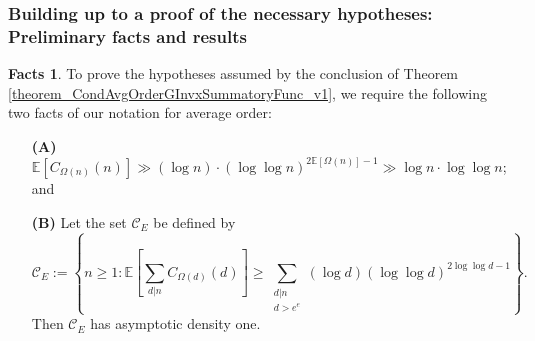 \documentclass[11pt,reqno,a4letter]{article}
\numberwithin{figure}{section}
\numberwithin{table}{section}
\theoremstyle{plain}
\numberwithin{theorem}{section}
\theoremstyle{definition}
\newtheorem{facts}[theorem]{Facts}
\begin{document}
\subsubsection{Building up to a proof of the necessary hypotheses: Preliminary facts and results} 
\label{subsubSection_ProvingTheNecessaryHyps_PrelimFactPfs} 

\begin{facts} 
To prove the hypotheses assumed by the conclusion of 
Theorem \ref{theorem_CondAvgOrderGInvxSummatoryFunc_v1}, 
we require the following two facts of our notation for average order: 
\begin{itemize} 
     \item[\textbf{(A)}] $\mathbb{E}[C_{\Omega(n)}(n)] \gg (\log n) \cdot (\log\log n)^{2\mathbb{E}[\Omega(n)]-1} \gg 
                          \log n \cdot \log\log n$; and 
     \item[\textbf{(B)}] Let the set $\mathcal{C}_E$ be defined by 
     \[
     \mathcal{C}_E := \left\{n \geq 1: 
          \mathbb{E}\left[\sum_{d|n} C_{\Omega(d)}(d)\right] \geq 
          \sum_{\substack{d|n \\ d > e^e}} (\log d) (\log\log d)^{2\log\log d - 1}  
          \right\}. 
     \]
     Then $\mathcal{C}_E$ has asymptotic density one. 
\end{itemize} 
\end{facts} 
\end{document}

